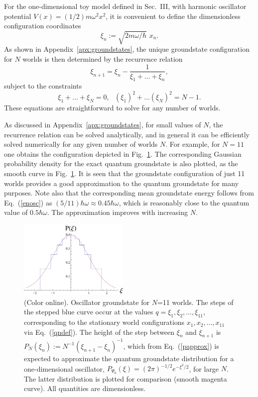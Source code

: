\documentclass[12pt, aps,pra,amsmath,amssymb,superscriptaddress]{revtex4-2}
\renewcommand{\(}{\left(}
\renewcommand{\)}{\right)}
\newcommand{\blk}{\color{black}}
\begin{document}
For the one-dimensional toy model defined in Sec.~III, with harmonic oscillator potential $V(x)=(1/2)m\omega^2 x^2$, it is convenient to define the dimensionless configuration coordinates
\begin{equation} \label{qndef}
{\xi}_n := \sqrt{2m\omega/\hbar} \,\,x_n .
\end{equation}
As shown in Appendix~\ref{apx:groundstates}, the unique groundstate configuration for $N$ worlds is then determined by the recurrence relation
\begin{equation}
\label{recur3}
{ \xi}_{n+1} = { \xi}_n - \frac{1}{{ \xi}_1+\dots+{ \xi}_n},
\end{equation}
subject to the constraints
\begin{equation} \label{cond2}
{ \xi}_1+\dots+{ \xi}_N = 0,~~~({ \xi}_1)^2+\dots ({ \xi}_N)^2 = N-1.
\end{equation}
These equations are straightforward to solve for any number of worlds.

As discussed in Appendix~\ref{apx:groundstates}, for small values of 
$N$, the recurrence relation 
can be solved analytically, and in general it can be \blk 
efficiently solved numerically for any given number of worlds $N$.  For example,
for $N=11$ one obtains the configuration depicted in Fig.~\ref{oscground21}. The
corresponding Gaussian probability density for the exact quantum groundstate is
also plotted, as the smooth curve in Fig.~\ref{oscground21}.  It is seen that
the groundstate configuration of just 11 worlds provides a good approximation to
the quantum groundstate for many purposes.  Note also that the corresponding
mean \blk groundstate energy follows from Eq.~(\ref{enosc}) as
  $(5/11)\hbar\omega\approx 0.45\hbar\omega$, which is reasonably close to the
quantum value of $0.5\hbar\omega$.  The approximation improves with increasing
$N$.

\begin{figure}[!t]
	\centering
		\includegraphics[width=0.47\textwidth]{finite_world_groundstatesN11.pdf}	
\caption{\label{oscground21}(Color online). Oscillator groundstate for $N$=11 worlds.  The steps of
    the stepped blue curve occur at the values $q={ \xi}_1,{
    \xi}_2,\dots,{ \xi}_{11}$, corresponding to the stationary world
    configurations  $x_1,x_2,\dots,x_{11}$ via Eq.~(\ref{qndef}).  The height of
    the step between ${ \xi}_{n}$ and ${ \xi}_{n+1}$ is $P_N({
    \xi}_n):=N^{-1}({ \xi}_{n+1}-{ \xi}_n)^{-1}$, which from
    Eq.~(\ref{papprox}) is expected to approximate the quantum groundstate
    distribution for a one-dimensional oscillator,
    $P_{\Psi_0}(\xi)=(2\pi)^{-1/2}e^{-\xi^2/2}$, for large $N$.  The latter
    distribution is plotted for comparison (smooth magenta curve).
All quantities are dimensionless.}
\end{figure}
\end{document}

